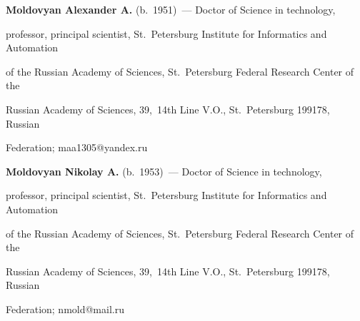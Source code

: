   \noindent


  \textbf{Moldovyan Alexander A.} (b.\ 1951)~--- Doctor of Science in technology, 


professor, principal scientist, St.\ Petersburg Institute for Informatics and Automation 


of the Russian Academy of Sciences, St.\ Petersburg Federal Research Center of the 


Russian Academy of Sciences, 39,~14th Line V.O., St.\ Petersburg 199178, Russian 


Federation; \mbox{maa1305@yandex.ru}


  


  \vspace*{3pt}


  


  


  \noindent


  \textbf{Moldovyan Nikolay A.} (b.\ 1953)~--- Doctor of Science in technology, 


professor, principal scientist, St.\ Petersburg Institute for Informatics and Automation 


of the Russian Academy of Sciences, St.\ Petersburg Federal Research Center of the 


Russian Academy of Sciences, 39,~14th Line V.O., St.\ Petersburg 199178, Russian 


Federation; \mbox{nmold@mail.ru}


  


\label{end\stat}





\renewcommand{\bibname}{\protect\rm Литература} 


  


